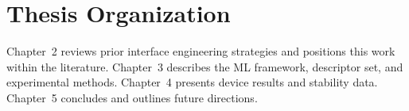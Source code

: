 \section{Thesis Organization}

Chapter~2 reviews prior interface engineering strategies and positions this
work within the literature. Chapter~3 describes the ML framework,
descriptor set, and experimental methods. Chapter~4 presents device results
and stability data. Chapter~5 concludes and outlines future directions.
